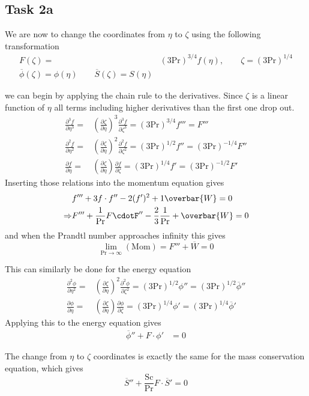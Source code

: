 \subsection*{Task 2a}
We are now to change the coordinates from $\eta$ to $\zeta$ using the following transformation
\begin{align*}
  F(\zeta) =& (3\text{Pr})^{3/4} f(\eta), \qquad \zeta = (3 \text{Pr})^{1/4} \\
  \overbar{\phi}(\zeta) = \phi (\eta) \qquad \overbar{S}(\zeta) = S(\eta )
\end{align*}

we can begin by applying the chain rule to the derivatives. Since $\zeta$ is a linear function of $\eta$ all terms including higher derivatives than the first one drop out.
\begin{align*}
  \frac{\partial^3 f}{\partial \eta^3}=& \left( \frac{\partial \zeta}{\partial \eta} \right)^3 \frac{\partial^3 f}{\partial \zeta^3}=(3 \text{Pr})^{3/4}f'''=F'''\\
  \frac{\partial^2 f}{\partial \eta^2}=& \left( \frac{\partial \zeta}{\partial \eta} \right)^2 \frac{\partial^2 f}{\partial \zeta^2}=(3 \text{Pr})^{1/2}f''=(3 \text{Pr})^{-1/4} F''\\
  \frac{\partial f}{\partial \eta}=& \left( \frac{\partial \zeta}{\partial \eta} \right) \frac{\partial f}{\partial \zeta}=(3 \text{Pr})^{1/4}f'=(3 \text{Pr})^{-1/2}F'
\end{align*}
Inserting those relations into the momentum equation gives
\begin{align*}
  &f'''+3f\cdot f'' -2(f')^2 + 1 \overbar{W} = 0 \\
  \Rightarrow& F''' +\frac{1}{\text{Pr}}F\cdotF'' -\frac{2}{3}\frac{1}{\text{Pr}}+\overbar{W}=0 
\end{align*}
and when the Prandtl number approaches infinity this gives
\begin{equation*}
  \lim_{\text{Pr}\rightarrow \infty} (\text{Mom}) = F'''+\overbar{W} =0
\end{equation*}

This can similarly be done for the energy equation
\begin{align*}
  \frac{\partial^2 \phi}{\partial \eta^2}=& \left( \frac{\partial \zeta}{\partial \eta} \right)^2 \frac{\partial^2 \phi}{\partial \zeta^2}=(3 \text{Pr})^{1/2}\phi'' =(3 \text{Pr})^{1/2}\overbar{\phi}'' \\
  \frac{\partial \phi}{\partial \eta}=& \left( \frac{\partial \zeta}{\partial \eta} \right) \frac{\partial \phi}{\partial \zeta}=(3 \text{Pr})^{1/4}\phi' =(3 \text{Pr})^{1/4}\overbar{\phi}' 
\end{align*}
Applying this to the energy equation gives
\begin{align*}
  \overbar{\phi}''+F\cdot\phi'&=0
\end{align*}

The change from $\eta$ to $\zeta$ coordinates is exactly the same for the mass conservation equation, which gives
\begin{equation*}
  \overbar{S}''+\frac{\text{Sc}}{\text{Pr}}F\cdot \overbar{S}'=0
\end{equation*}


